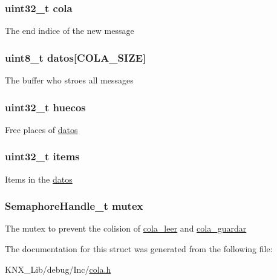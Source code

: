 \subsubsection[{\texorpdfstring{cola}{cola}}]{\setlength{\rightskip}{0pt plus 5cm}uint32\+\_\+t cola}\hypertarget{structt__cola_ae6eec6efa2dd9d70da13b2a435c3de27}{}\label{structt__cola_ae6eec6efa2dd9d70da13b2a435c3de27}
The end indice of the new message 
\subsubsection[{\texorpdfstring{datos}{datos}}]{\setlength{\rightskip}{0pt plus 5cm}uint8\+\_\+t datos\mbox{[}{\bf C\+O\+L\+A\+\_\+\+S\+I\+ZE}\mbox{]}}\hypertarget{structt__cola_a8eaaf6d0a3ebef35b2d6c94e9a63bf3d}{}\label{structt__cola_a8eaaf6d0a3ebef35b2d6c94e9a63bf3d}
The buffer who stroes all messages 
\subsubsection[{\texorpdfstring{huecos}{huecos}}]{\setlength{\rightskip}{0pt plus 5cm}uint32\+\_\+t huecos}\hypertarget{structt__cola_a326c5b8fc3633ed405339faf05e5a552}{}\label{structt__cola_a326c5b8fc3633ed405339faf05e5a552}
Free places of \hyperlink{structt__cola_a8eaaf6d0a3ebef35b2d6c94e9a63bf3d}{datos} 
\subsubsection[{\texorpdfstring{items}{items}}]{\setlength{\rightskip}{0pt plus 5cm}uint32\+\_\+t items}\hypertarget{structt__cola_a3691abaa51fe86a073eaabdd1c39b74c}{}\label{structt__cola_a3691abaa51fe86a073eaabdd1c39b74c}
Items in the \hyperlink{structt__cola_a8eaaf6d0a3ebef35b2d6c94e9a63bf3d}{datos} 
\subsubsection[{\texorpdfstring{mutex}{mutex}}]{\setlength{\rightskip}{0pt plus 5cm}Semaphore\+Handle\+\_\+t mutex}\hypertarget{structt__cola_afc659d089f5608a17e8650e59a7e26fc}{}\label{structt__cola_afc659d089f5608a17e8650e59a7e26fc}
The mutex to prevent the colision of \hyperlink{group___cola___exported___functions___group2_ga12fe948f259d8c9d7a390a76c416b55c}{cola\+\_\+leer} and \hyperlink{group___cola___exported___functions___group2_gaa639dba8be8eec5d19259aeb8de2cd7a}{cola\+\_\+guardar} 

The documentation for this struct was generated from the following file\+:\begin{DoxyCompactItemize}
\item 
K\+N\+X\+\_\+\+Lib/debug/\+Inc/\hyperlink{cola_8h}{cola.\+h}\end{DoxyCompactItemize}
